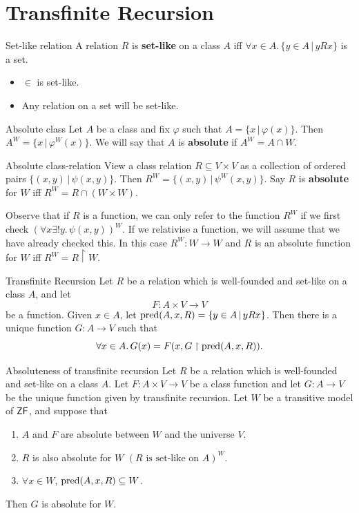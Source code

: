 \documentclass{article}
\begin{document}
\section{Transfinite Recursion}
\begin{fancydefine}{Set-like relation}
    A relation $R$ is \textbf{set-like} on a class $A$ iff $\forall x \in A. \, \{ y \in A\, |\, yRx\}$ is a set.
\end{fancydefine}
\begin{ex*}\hspace{0.1cm}
    \begin{itemize}
        \item $\in$ is set-like.
        \item Any relation on a set will be set-like.
    \end{itemize}
\end{ex*}
\begin{fancydefine}{Absolute class}
    Let $A$ be a class and fix $\varphi$ such that $A = \{ x \,| \, \varphi(x)\}$. Then $A^{W} = \{x \, | \, \varphi^{W}(x)\}$. We will say that $A$ is \textbf{absolute} if $A^{W} = A \cap W$.
\end{fancydefine}
\begin{fancydefine}{Absolute class-relation}
    View a class relation $R \subseteq V \times V$ as a collection of ordered pairs $\{ (x,y) \, | \, \psi(x,y)\}$. Then $R^{W} = \{(x,y) \, | \, \psi^{W}(x,y)\}$. Say $R$ is \textbf{absolute} for $W$ iff $R^{W} = R \cap (W \times W)$.
\end{fancydefine}
Observe that if $R$ is a function, we can only refer to the function $R^{W}$ if we first check $(\forall x \exists! y. \, \psi(x,y))^{W}$. If we relativise a function, we will assume that we have already checked this. In this case $R^{W} : W \to W$ and $R$ is an absolute function for $W$ iff $R^{W} = R \upharpoonright W$.
\begin{fancythm}{Transfinite Recursion}
    Let $R$ be a relation which is well-founded and set-like on a class $A$, and let \[ F : A \times V \to V\] be a function. Given $x \in A$, let $\operatorname{pred}(A,x,R) = \{ y \in A \, | \, yRx\}$. Then there is a unique function $G: A \to V$ such that \[ \forall x \in A. \, G(x)=F(x,G \upharpoonright \operatorname{pred}(A,x,R)).\]
\end{fancythm}
\begin{fancythm}{Absoluteness of transfinite recursion}
    Let $R$ be a relation which is well-founded and set-like on a class $A$. Let $F : A \times V \to V$ be a class function and let $G : A \to V$ be the unique function given by transfinite recursion. Let $W$ be a transitive model of $\mathsf{ZF}$, and suppose that \begin{enumerate}
        \item $A$ and $F$ are absolute between $W$ and the universe $V$.
        \item $R$ is also absolute for $W$ $(R \text{ is set-like on } A)^{W}$.
        \item $\forall x \in W$, $\operatorname{pred}(A,x,R) \subseteq W$.
    \end{enumerate}
    Then $G$ is absolute for $W$.
\end{fancythm}
\end{document}
